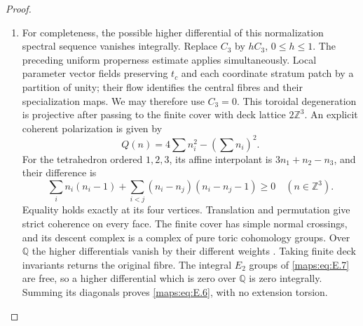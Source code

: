 \begin{proof}
\begin{enumerate}[label={$\langle1\rangle$\arabic*.},leftmargin=*]
\item For completeness, the possible higher differential of this
normalization spectral sequence vanishes integrally.  Replace $C_3$
by $hC_3$, $0\leq h\leq1$.  The preceding uniform properness estimate
applies simultaneously.  Local parameter vector fields preserving
$t_c$ and each coordinate stratum patch by a partition of unity;
their flow identifies the central fibres and their specialization
maps.  We may therefore use $C_3=0$.  This toroidal degeneration is
projective after passing to the finite cover with deck lattice
$2\mathbb Z^3$.  An explicit coherent polarization is given by
\[
 Q(n)=4\sum n_i^2-(\sum n_i)^2.
\]
For the tetrahedron ordered $1,2,3$, its affine interpolant is
$3n_1+n_2-n_3$, and their difference is
\[
 \sum_i n_i(n_i-1)+
 \sum_{i<j}(n_i-n_j)(n_i-n_j-1)\geq0
 \quad(n\in\mathbb Z^3).
\]
Equality holds exactly at its four vertices.  Translation and
permutation give strict coherence on every face.  The finite cover
has simple normal crossings, and its descent complex is a complex
of pure toric cohomology groups.  Over $\mathbb Q$ the higher
differentials vanish by their different weights \cite[Proposition~8.3.5, pp.~42--43]{mapsDeligne1974HodgeIII}.  Taking finite
deck invariants returns the original fibre.  The integral $E_2$
groups of \eqref{maps:eq:E.7} are free, so a higher differential which is zero
over $\mathbb Q$ is zero integrally.  Summing its diagonals proves
\eqref{maps:eq:E.6}, with no extension torsion.


\end{enumerate}
\end{proof}

